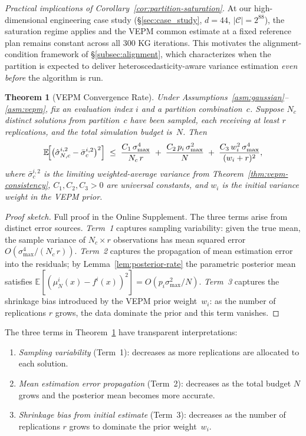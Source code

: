 \documentclass[12pt]{article}
\theoremstyle{plain}
\newtheorem{theorem}{Theorem}[section]
\theoremstyle{definition}
\theoremstyle{remark}
\begin{document}
\noindent\emph{Practical implications of
Corollary~\ref{cor:partition-saturation}.}  At our high-dimensional
engineering case study (\S\ref{sec:case_study}, $d=44$,
$|\mathcal{C}|=2^{88}$), the saturation regime applies and the VEPM
common estimate at a fixed reference plan remains constant across all
$300$ KG iterations.  This motivates the alignment-condition framework of
\S\ref{subsec:alignment}, which characterizes when the partition is
expected to deliver heteroscedasticity-aware variance estimation
\emph{even before} the algorithm is run.

\begin{theorem}[VEPM Convergence Rate]\label{thm:vepm-rate}
Under Assumptions~\ref{asm:gaussian}--\ref{asm:vepm}, fix an evaluation
index $i$ and a partition combination~$c$.  Suppose $N_{c}$ distinct
solutions from partition~$c$ have been sampled, each receiving at least
$r$ replications, and the total simulation budget is~$N$.  Then
\[
  \mathbb{E}\!\Bigl[
    \bigl(\hat{\sigma}_{N,c}^{i,2}-\bar{\sigma}_{c}^{i,2}\bigr)^{2}
  \Bigr]
  \;\le\;
  \frac{C_{1}\,\sigma_{\max}^{4}}{N_{c}\,r}
  \;+\;
  \frac{C_{2}\,p_{i}\,\sigma_{\max}^{2}}{N}
  \;+\;
  \frac{C_{3}\,w_{i}^{2}\,\sigma_{\max}^{4}}{(w_{i}+r)^{2}},
\]
where $\bar{\sigma}_{c}^{i,2}$ is the limiting weighted-average variance
from Theorem~\ref{thm:vepm-consistency}, $C_{1},C_{2},C_{3}>0$ are
universal constants, and $w_{i}$ is the initial variance weight in the
VEPM prior.
\end{theorem}

\begin{proof}[Proof sketch]
Full proof in the Online Supplement.
The three terms arise from distinct error sources.
\emph{Term~1} captures sampling variability: given the true mean, the
sample variance of $N_{c}\times r$ observations has mean squared error
$O(\sigma_{\max}^{4}/(N_{c}\,r))$.
\emph{Term~2} captures the propagation of mean estimation error into the
residuals; by Lemma~\ref{lem:posterior-rate} the parametric posterior
mean satisfies
$\mathbb{E}[(\mu_{N}^{i}(x)-f^{i}(x))^{2}]=O(p_{i}\sigma_{\max}^{2}/N)$.
\emph{Term~3} captures the shrinkage bias introduced by the VEPM prior
weight~$w_{i}$: as the number of replications $r$ grows, the data
dominate the prior and this term vanishes.
\end{proof}

The three terms in Theorem~\ref{thm:vepm-rate} have transparent
interpretations:
\begin{enumerate}
  \item \emph{Sampling variability} (Term~1): decreases as more
    replications are allocated to each solution.
  \item \emph{Mean estimation error propagation} (Term~2): decreases as
    the total budget $N$ grows and the posterior mean becomes more
    accurate.
  \item \emph{Shrinkage bias from initial estimate} (Term~3): decreases
    as the number of replications $r$ grows to dominate the prior
    weight~$w_{i}$.
\end{enumerate}
\end{document}
